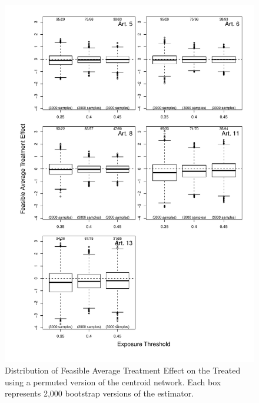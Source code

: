 \documentclass[10pt]{article}
\begin{document}
\begin{figure}[H]
	\centering
	\includegraphics[width=.8\linewidth]{../fig/matching_bloxplot_dummy.pdf}
	\caption{Distribution of Feasible Average Treatment Effect on the Treated using a permuted version of the centroid network. Each box represents 2,000 bootstrap versions of the estimator.}
\end{figure}
\end{document}

